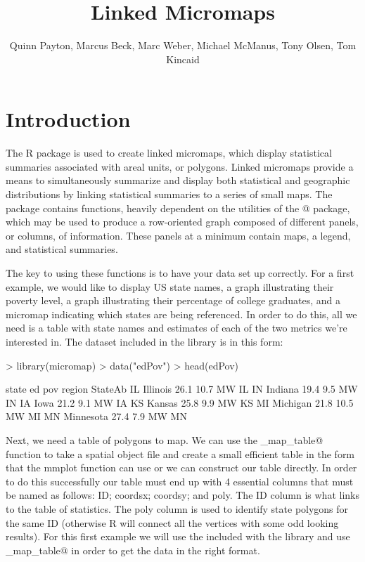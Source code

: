 \documentclass{article}
\newcommand{\R}{{\normalfont\textsf{R }}{}}
\begin{document}


\title{Linked Micromaps}

\author{Quinn Payton, Marcus Beck, Marc Weber, Michael McManus, Tony Olsen, Tom Kincaid}
\maketitle


\section{Introduction}
The \R package \verb@micromap@ is used to create linked micromaps, which display statistical summaries associated with areal units, or polygons. Linked micromaps provide a means to simultaneously summarize and display both statistical and geographic distributions by linking statistical summaries to a series of small maps. The package contains functions, heavily dependent on the utilities of the @ package, which may be used to produce a row-oriented graph composed of different panels, or columns, of information. These panels at a minimum contain maps, a legend, and statistical summaries.

The key to using these functions is to have your data set up correctly. For a first example, we would like to display US state names, a graph illustrating their poverty level, a graph illustrating their percentage of college graduates, and a micromap indicating which states are being referenced. In order to do this, all we need is a table with state names and estimates of each of the two metrics we're interested in. The dataset \verb@edpov@ included in the \verb@micromap@ library is in this form:

\begin{Schunk}
\begin{Sinput}
> library(micromap)
> data("edPov") 
> head(edPov)
\end{Sinput}
\begin{Soutput}
       state   ed  pov region StateAb
IL  Illinois 26.1 10.7     MW      IL
IN   Indiana 19.4  9.5     MW      IN
IA      Iowa 21.2  9.1     MW      IA
KS    Kansas 25.8  9.9     MW      KS
MI  Michigan 21.8 10.5     MW      MI
MN Minnesota 27.4  7.9     MW      MN
\end{Soutput}
\end{Schunk}

Next, we need a table of polygons to map. We can use the \verb@create_map_table@ function to take a spatial object file and create a small efficient table in the form that the mmplot function can use or we can construct our table directly.  In order to do this successfully our table must end up with 4 essential columns that must be named as follows:  ID; coordsx; coordsy; and poly. The ID column is what links to the table of statistics. The poly column is used to identify state polygons for the same ID (otherwise R will connect all the vertices with some odd looking results). For this first example we will use the \verb@USstates@ included with the library and use \verb@create_map_table@ in order to get the data in the right format. 
\end{document}
